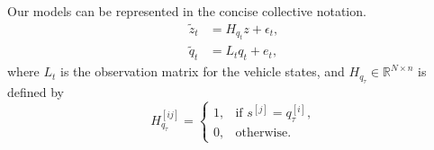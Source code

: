 \documentclass[letterpaper, 10 pt, conference]{ieeeconf}
\newcommand{\Real}{\mathbb{R}}
\newcommand{\tildez}[1]{{\tilde{z}_{#1}}}
\begin{document}
Our models can be represented in the  concise  collective notation.
\begin{equation}
\begin{split}
\tildez{t} &= H_{q_t} z + \epsilon_t,\\
\tilde{q}_t & = L_t q_t + e_t,
\end{split}
\label{eq:y}
\end{equation}
where $L_t$ is the observation matrix for the vehicle states, and $H_{q_\tau} \in \Real^{N \times n}$ is defined by
\begin{equation*}
 H_{q_\tau}^{[ij]} = \left\{
 \begin{array}{ll}
 1, & \text{if $s^{[j]} = q_{\tau}^{[i]}$}, \\
 0, & \text{otherwise}.
 \end{array}
 \right.
\end{equation*}
\end{document}
